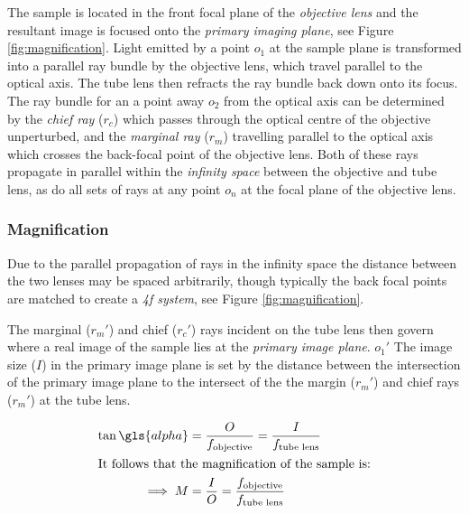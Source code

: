 The sample is located in the front focal plane of the \emph{\gls{objective lens}} and the resultant image is focused onto the \emph{\gls{primary imaging plane}}, see Figure \ref{fig:magnification}.
Light emitted by a point $o_1$ at the sample plane is transformed into a parallel ray bundle by the \gls{objective lens}, which travel parallel to the optical axis.
The tube lens then refracts the ray bundle back down onto its focus.
The ray bundle for an a point away $o_2$ from the optical axis can be determined by the \emph{chief ray} ($r_c$) which passes through the optical centre of the objective unperturbed, and the \emph{marginal ray} ($r_m$) travelling parallel to the optical axis which crosses the back-focal point of the \gls{objective lens}.
Both of these rays propagate in parallel within the \emph{infinity space} between the objective and tube lens, as do all sets of rays at any point $o_n$ at the focal plane of the \gls{objective lens}.

\subsubsection{Magnification}

Due to the parallel propagation of rays in the infinity space the distance between the two lenses may be spaced arbitrarily, though typically the back focal points are matched to create a \emph{\gls{4f} system}, see Figure \ref{fig:magnification}.

The marginal ($r_m'$) and chief ($r_c'$) rays incident on the tube lens then govern where a real image of the sample lies at the \emph{primary image plane}. %
$o_1'$
The image size ($I$) in the primary image plane is set by the distance between the intersection of the primary image plane to the intersect of the the margin ($r_m'$) and chief rays ($r_m'$) at the tube lens.


\begin{align}
    \tan \gls{alpha} &= \frac{O}{f_{\text{objective}}} =  \frac{I}{f_{\text{tube lens}}} \\
    \intertext{It follows that the magnification of the sample is:}
    \implies M &= \frac{I}{O} = \frac{f_{\text{objective}}}
{f_{\text{tube lens}}}
\end{align}


